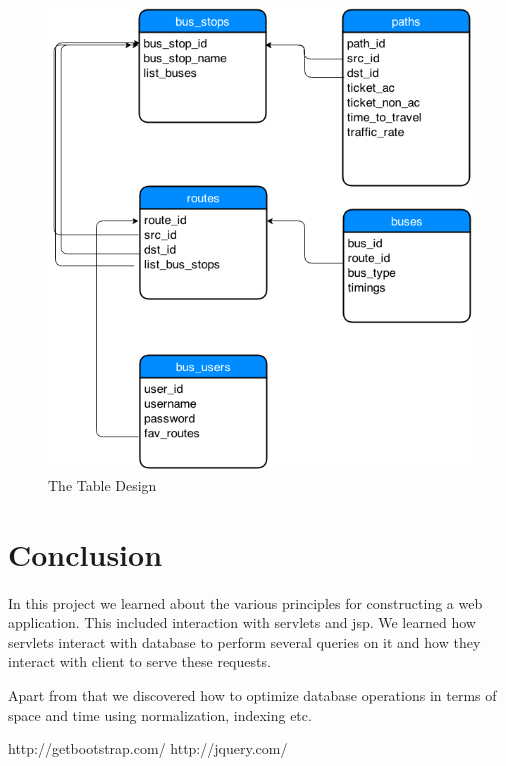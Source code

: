 \documentclass[11pt]{article}
\begin{document}
\begin{figure}[ht!]
\center
\includegraphics[width=150mm]{shots/table.png}
\caption{The Table Design}
\label{overflow}
\end{figure}
\pagebreak{}

\section{Conclusion}
\paragraph{}

In this project we learned about the various principles for constructing a web application. This included interaction with servlets and jsp. We learned how servlets interact with database to perform several queries on it and how they interact with client to serve these requests.

Apart from that we discovered how to optimize database operations in terms of space and time using normalization, indexing etc.


\pagebreak{}

\begin{thebibliography}{9}
http://getbootstrap.com/
	http://jquery.com/
\end{thebibliography}
\end{document}
